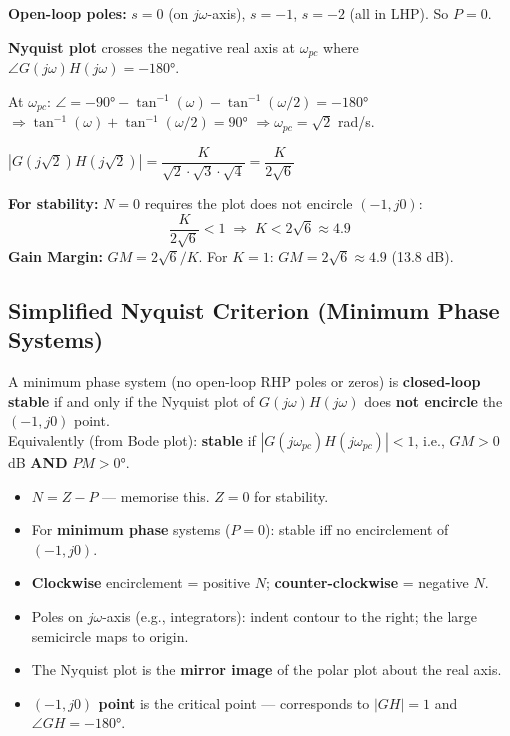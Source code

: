 \documentclass[12pt,a4paper]{article}
\begin{document}
\begin{tcolorbox}[examplebox, title={Example: $G(s)H(s) = K/[s(s+1)(s+2)]$, find stability range}]
\textbf{Open-loop poles:} $s=0$ (on $j\omega$-axis), $s=-1$, $s=-2$ (all in LHP). So $P=0$.

\textbf{Nyquist plot} crosses the negative real axis at $\omega_{pc}$ where $\angle G(j\omega)H(j\omega) = -180°$.

At $\omega_{pc}$: $\angle = -90° - \tan^{-1}(\omega) - \tan^{-1}(\omega/2) = -180°$
$\Rightarrow \tan^{-1}(\omega) + \tan^{-1}(\omega/2) = 90°$
$\Rightarrow \omega_{pc} = \sqrt{2}$ rad/s.

$|G(j\sqrt{2})H(j\sqrt{2})| = \dfrac{K}{\sqrt{2}\cdot\sqrt{3}\cdot\sqrt{4}} = \dfrac{K}{2\sqrt{6}}$

\textbf{For stability:} $N=0$ requires the plot does not encircle $(-1,j0)$:
$$\frac{K}{2\sqrt{6}} < 1 \;\Rightarrow\; K < 2\sqrt{6} \approx 4.9$$
\textbf{Gain Margin:} $GM = 2\sqrt{6}/K$. For $K=1$: $GM = 2\sqrt{6} \approx 4.9$ (13.8 dB).
\end{tcolorbox}

\subsection{Simplified Nyquist Criterion (Minimum Phase Systems)}

\begin{tcolorbox}[formulabox, title={For Minimum Phase Systems ($P=0$)}]
A minimum phase system (no open-loop RHP poles or zeros) is \textbf{closed-loop stable} if and only if the Nyquist plot of $G(j\omega)H(j\omega)$ does \textbf{not encircle} the $(-1, j0)$ point.\\[4pt]
Equivalently (from Bode plot): \textbf{stable} if $|G(j\omega_{pc})H(j\omega_{pc})| < 1$, i.e., $GM > 0$ dB \textbf{AND} $PM > 0°$.
\end{tcolorbox}

\begin{tcolorbox}[exambox, title={Exam Tips --- Nyquist Criterion}]
\begin{itemize}[leftmargin=*, itemsep=3pt, topsep=0pt]
  \item \textbf{$N = Z - P$} --- memorise this. $Z=0$ for stability.
  \item For \textbf{minimum phase} systems ($P=0$): stable iff no encirclement of $(-1,j0)$.
  \item \textbf{Clockwise} encirclement = positive $N$; \textbf{counter-clockwise} = negative $N$.
  \item Poles on $j\omega$-axis (e.g., integrators): indent contour to the right; the large semicircle maps to origin.
  \item The Nyquist plot is the \textbf{mirror image} of the polar plot about the real axis.
  \item \textbf{$(-1,j0)$ point} is the critical point --- corresponds to $|GH|=1$ and $\angle GH = -180°$.
\end{itemize}
\end{tcolorbox}
\end{document}
